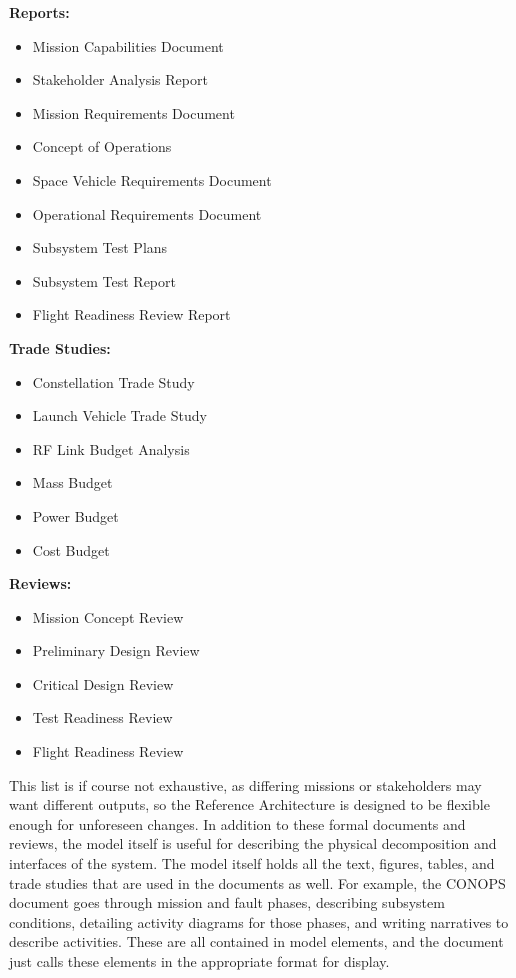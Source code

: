 \textbf{Reports:}
\begin{itemize}
    \item Mission Capabilities Document
    \item Stakeholder Analysis Report
    \item Mission Requirements Document
    \item Concept of Operations
    \item Space Vehicle Requirements Document
    \item Operational Requirements Document
    \item Subsystem Test Plans
    \item Subsystem Test Report
    \item Flight Readiness Review Report
\end{itemize}

\textbf{Trade Studies:}
\begin{itemize}
    \item Constellation Trade Study
    \item Launch Vehicle Trade Study
    \item RF Link Budget Analysis
    \item Mass Budget
    \item Power Budget
    \item Cost Budget
\end{itemize}

\textbf{Reviews:}
\begin{itemize}
    \item Mission Concept Review
    \item Preliminary Design Review
    \item Critical Design Review
    \item Test Readiness Review
    \item Flight Readiness Review
\end{itemize}

This list is if course not exhaustive, as differing missions or stakeholders may want different outputs, so the Reference Architecture is designed to be flexible enough for unforeseen changes. In addition to these formal documents and reviews, the model itself is useful for describing the physical decomposition and interfaces of the system. The model itself holds all the text, figures, tables, and trade studies that are used in the documents as well. For example, the CONOPS document goes through mission and fault phases, describing subsystem conditions, detailing activity diagrams for those phases, and writing narratives to describe activities. These are all contained in model elements, and the document just calls these elements in the appropriate format for display. 

